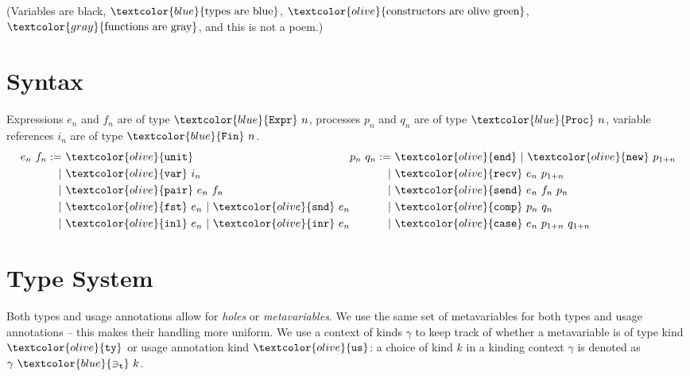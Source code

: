 \documentclass[sigplan,screen,review]{acmart}
\newcommand{\constr}[1]{\textcolor{olive}{\mathtt{#1}}}
\newcommand{\func}[1]{\textcolor{gray}{\mathtt{#1}}}
\newcommand{\type}[1]{\textcolor{blue}{\mathtt{#1}}}
\newcommand{\Fin}[1]{\type{Fin}~#1}
\newcommand{\sExpr}[1]{\type{Expr}~#1}
\newcommand{\sProc}[1]{\type{Proc}~#1}
\newcommand{\tvar}[2]{#1 ~\type{\ni_t}~ #2}
\newcommand{\sunit}{\constr{unit}}
\newcommand{\svar}{\constr{var}}
\newcommand{\sfst}{\constr{fst}}
\newcommand{\ssnd}{\constr{snd}}
\newcommand{\sinl}{\constr{inl}}
\newcommand{\sinr}{\constr{inr}}
\newcommand{\spair}{\constr{pair}}
\newcommand{\send}{\constr{end}}
\newcommand{\snew}{\constr{new}}
\newcommand{\scomp}{\constr{comp}}
\newcommand{\srecv}{\constr{recv}}
\newcommand{\ssend}{\constr{send}}
\newcommand{\scase}{\constr{case}}
\newcommand{\ktype}{\constr{ty}}
\newcommand{\kusage}{\constr{us}}
\begin{document}
(Variables are black, $\type{\textrm{types are blue}}$, $\constr{\textrm{constructors are olive green}}$, $\func{\textrm{functions are gray}}$, and this is not a poem.)


\section{Syntax}\label{syntax}

Expressions $e_n$ and $f_n$ are of type $\sExpr{n}$, processes $p_n$ and $q_n$ are of type $\sProc{n}$, variable references $i_n$ are of type $\Fin{n}$.
\[
\begin{aligned}[c]
  e_n ~ f_n  :=
  &~ \sunit \\
  |&~ \svar~i_n \\
  |&~ \spair~e_n~f_n \\
  |&~ \sfst~e_n ~|~  \ssnd~e_n \\
  |&~ \sinl~e_n ~|~  \sinr~e_n
\end{aligned}
\begin{aligned}[c]
  p_n ~ q_n  :=
  &~ \send ~|~  \snew~p_{1+n} \\
  |&~ \srecv~e_n~p_{1+n} \\
  |&~ \ssend~e_n~f_n~p_n \\
  |&~ \scomp~p_n~q_n \\
  |&~ \scase~e_n~p_{1+n}~q_{1+n}
\end{aligned}
\]

\section{Type System}\label{type-system}

Both types and usage annotations allow for \emph{holes} or \emph{metavariables}.
We use the same set of metavariables for both types and usage annotations -- this makes their handling more uniform.
We use a context of kinds \(\gamma\) to keep track of whether a metavariable is of type kind $\ktype$ or usage annotation kind $\kusage$: a choice of kind \(k\) in a kinding context \(\gamma\) is denoted as $\tvar{\gamma}{k}$.
\end{document}
